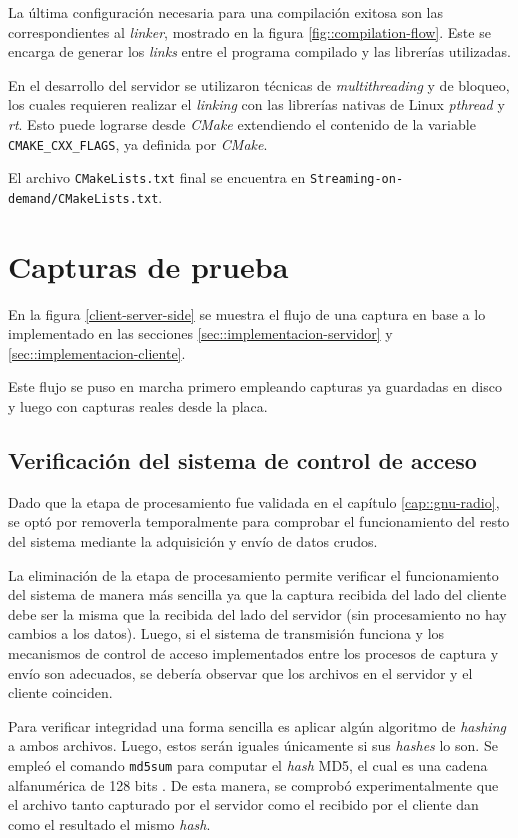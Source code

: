 \documentclass[../../main.tex]{subfiles}
\begin{document}
La última configuración necesaria para una compilación exitosa son las correspondientes al \textit{linker}, mostrado en la figura \ref{fig::compilation-flow}. Este se encarga de generar los \textit{links} entre el programa compilado y las librerías utilizadas.

En el desarrollo del servidor se utilizaron técnicas de \textit{multithreading} y de bloqueo, los cuales requieren realizar el \textit{linking} con las librerías nativas de Linux \textit{pthread} y \textit{rt}.  Esto puede lograrse desde \textit{CMake} extendiendo el contenido de la variable \texttt{CMAKE\_CXX\_FLAGS}, ya definida por \textit{CMake}.

El archivo \texttt{CMakeLists.txt} final se encuentra en \texttt{Streaming-on-demand/CMakeLists.txt}.


\section{Capturas de prueba}
En la figura \ref{client-server-side} se muestra el flujo de una captura en base a lo implementado en las secciones \ref{sec::implementacion-servidor} y \ref{sec::implementacion-cliente}.

Este flujo se puso en marcha primero empleando capturas ya guardadas en disco y luego con capturas reales desde la placa.

\subsection{Verificación del sistema de control de acceso}
Dado que la etapa de procesamiento fue validada en el capítulo \ref{cap::gnu-radio}, se optó por removerla temporalmente para comprobar el funcionamiento del resto del sistema mediante la adquisición y envío de datos crudos.

La eliminación de la etapa de procesamiento permite verificar el funcionamiento del sistema de manera más sencilla ya que la captura recibida del lado del cliente debe ser la misma que la recibida del lado del servidor (sin procesamiento no hay cambios a los datos). Luego, si el sistema de transmisión funciona y los mecanismos de control de acceso implementados entre los procesos de captura y envío son adecuados, se debería observar que los archivos en el servidor y el cliente coinciden.

Para verificar integridad una forma sencilla es aplicar algún algoritmo de \textit{hashing}  a ambos archivos. Luego, estos serán iguales únicamente si sus \textit{hashes} lo son. Se empleó el comando \texttt{md5sum} para computar el \textit{hash} MD5, el cual es una cadena alfanumérica de 128 bits . De esta manera, se comprobó experimentalmente que el archivo tanto capturado por el servidor como el recibido por el cliente dan como el resultado el mismo \textit{hash}.

\end{document}
